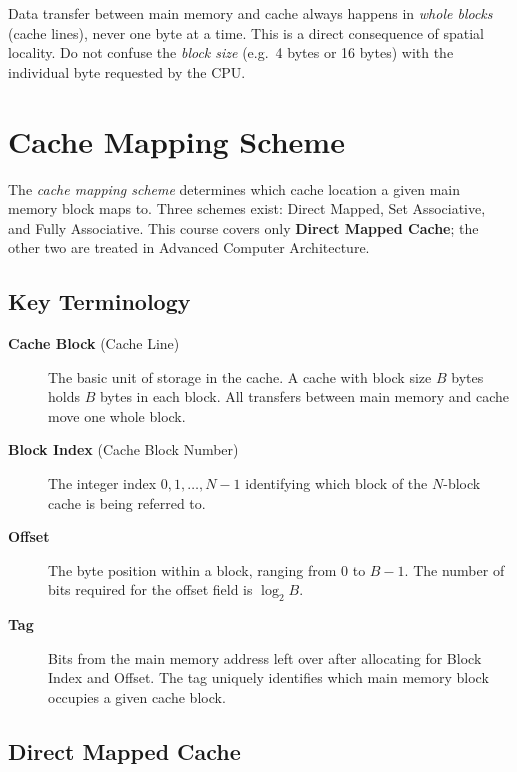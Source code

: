 \documentclass[11pt, a4paper, notitlepage]{report}
\theoremstyle{definition}
\theoremstyle{remark}
\theoremstyle{definition}
\begin{document}
\begin{examtip}[title={Exam Tip: Transfer is Always in Blocks}]
  Data transfer between main memory and cache always happens in \emph{whole blocks} (cache lines), never one byte at a time. This is a direct consequence of spatial locality. Do not confuse the \emph{block size} (e.g.\ 4 bytes or 16 bytes) with the individual byte requested by the CPU.
\end{examtip}

\section{Cache Mapping Scheme}
\label{sec:cache-mapping}

The \emph{cache mapping scheme} determines which cache location a given main memory block maps to. Three schemes exist: Direct Mapped, Set Associative, and Fully Associative. This course covers only \textbf{Direct Mapped Cache}; the other two are treated in Advanced Computer Architecture.

\subsection{Key Terminology}
\label{sec:cache-terms}

\begin{description}
  \item[\textbf{Cache Block} (Cache Line)] The basic unit of storage in the cache. A cache with block size $B$ bytes holds $B$ bytes in each block. All transfers between main memory and cache move one whole block.
  \item[\textbf{Block Index} (Cache Block Number)] The integer index $0, 1, \ldots, N-1$ identifying which block of the $N$-block cache is being referred to.
  \item[\textbf{Offset}] The byte position within a block, ranging from $0$ to $B-1$. The number of bits required for the offset field is $\log_2 B$.
  \item[\textbf{Tag}] Bits from the main memory address left over after allocating for Block Index and Offset. The tag uniquely identifies which main memory block occupies a given cache block.
\end{description}

\subsection{Direct Mapped Cache}
\label{sec:direct-mapped}
\end{document}

